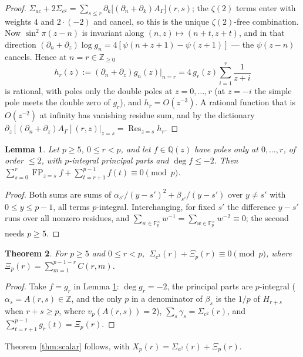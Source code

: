 \documentclass[11pt,a4paper]{amsart}
\theoremstyle{plain}
\newtheorem{theorem}{Theorem}[section]
\newtheorem{lemma}[theorem]{Lemma}
\theoremstyle{definition}
\theoremstyle{remark}
\newcommand{\ZZ}{\mathbb{Z}}
\newcommand{\QQ}{\mathbb{Q}}
\newcommand{\FF}{\mathbb{F}}
\newcommand{\A}{A}
\begin{document}
\begin{proof}
$\Sigma_{ac}+2\Sigma_{c^2}=\sum_{s\le r}\partial_k\bigl[(\partial_n+\partial_k)
\A_\Gamma\bigr](r,s)$; the $\zeta(2)$ terms enter with weights $4$ and $2\cdot(-2)$ and
cancel, so this is the unique $\zeta(2)$-free combination. Now $\sin^2\pi(z-n)$ is
invariant along $(n,z)\mapsto(n+t,z+t)$, and in that direction
$(\partial_n+\partial_z)\log g_n=4[\psi(n+z+1)-\psi(z+1)]$ — the $\psi(z-n)$ cancels.
Hence at $n=r\in\ZZ_{\ge0}$
\[
  h_r(z):=(\partial_n+\partial_z)g_n(z)\big|_{n=r}=4\,g_r(z)\sum_{i=1}^{r}\frac1{z+i}
\]
is rational, with poles only the double poles at $z=0,\dots,r$ (at $z=-i$ the simple
pole meets the double zero of $g_r$), and $h_r=O(z^{-3})$. A rational function that is
$O(z^{-2})$ at infinity has vanishing residue sum, and by the dictionary
$\partial_z[(\partial_n+\partial_z)\A_\Gamma](r,z)|_{z=s}=\operatorname*{Res}_{z=s}h_r$.
\end{proof}

\begin{lemma}\label{lem:fp}
Let $p\ge5$, $0\le r<p$, and let $f\in\QQ(z)$ have poles only at $0,\dots,r$, of order
$\le2$, with $p$-integral principal parts and $\deg f\le-2$. Then
$\sum_{s=0}^{r}\operatorname{FP}_{z=s}f+\sum_{t=r+1}^{p-1}f(t)\equiv0\pmod p$.
\end{lemma}

\begin{proof}
Both sums are sums of $\alpha_{s'}/(y-s')^2+\beta_{s'}/(y-s')$ over $y\ne s'$ with
$0\le y\le p-1$, all terms $p$-integral. Interchanging, for fixed $s'$ the difference
$y-s'$ runs over all nonzero residues, and $\sum_{w\in\FF_p^\times}w^{-1}
=\sum_{w\in\FF_p^\times}w^{-2}\equiv0$; the second needs $p\ge5$.
\end{proof}

\begin{theorem}\label{thm:R2}
For $p\ge5$ and $0\le r<p$, $\ \Sigma_{c^2}(r)+\Xi_p(r)\equiv0\pmod p$, where
$\Xi_p(r)=\sum_{m=1}^{p-1-r}C(r,m)$.
\end{theorem}

\begin{proof}
Take $f=g_r$ in Lemma \ref{lem:fp}: $\deg g_r=-2$, the principal parts are $p$-integral
($\alpha_s=\A(r,s)\in\ZZ$, and the only $p$ in a denominator of $\beta_s$ is the $1/p$ of
$H_{r+s}$ when $r+s\ge p$, where $v_p(\A(r,s))=2$), $\sum_s\gamma_s=\Sigma_{c^2}(r)$, and
$\sum_{t=r+1}^{p-1}g_r(t)=\Xi_p(r)$.
\end{proof}

Theorem \ref{thm:scalar} follows, with $X_p(r)=\Sigma_{a^2}(r)+\Xi_p(r)$.
\end{document}
